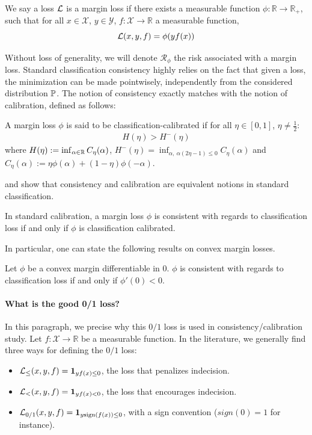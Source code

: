 \begin{definition} We say a loss $\mathcal{L}$ is a margin loss if there exists a measurable function $\phi:\mathbb{R}\to\mathbb{R}_+$, such that for all $x\in\mathcal{X}$, $y\in\mathcal{Y}$, $f:\mathcal{X}\to\mathbb{R}$ a measurable function,
$$\mathcal{L}(x,y,f)=\phi(yf(x))$$
\end{definition}
Without loss of generality, we will denote $\mathcal{R}_\phi$ the risk associated with a margin loss. Standard classification consistency highly relies on the fact that given a loss, the minimization can be made pointwisely, independently from the considered distribution $\mathbb{P}$. The notion of consistency exactly matches with the notion of calibration, defined as follows:
\begin{definition} A margin loss $\phi$ is said to be classification-calibrated if for all $\eta\in[0,1]$, $\eta\neq \frac12$:
\begin{align*}
    H(\eta)>H^-(\eta)
\end{align*}
where $H(\eta):=\inf_{\alpha\in\mathbb{R}}C_\eta(\alpha)$,  $H^-(\eta) = \inf_{\alpha,~\alpha(2\eta-1)\leq0}C_\eta(\alpha)$ and $C_\eta(\alpha):=\eta\phi(\alpha)+(1-\eta)\phi(-\alpha)$.
\end{definition}

\cite{bartlett2006convexity} and \cite{steinwart2007compare} show that consistency and calibration are equivalent notions in standard classification.

\begin{thm} In standard calibration, a margin loss $\phi$ is consistent with regards to classification loss if and only if $\phi$ is classification calibrated. 
\end{thm}

In particular, one can state the following results on convex margin losses.
\begin{thm} Let $\phi$ be a convex margin differentiable in $0$. $\phi$ is consistent with regards to  classification loss if and only if $\phi'(0)<0$.
\end{thm}
\paragraph{What is the good 0/1 loss?}
In this paragraph, we precise why this $0/1$ loss is used in consistency/calibration study. Let $f:\mathcal{X}\to\mathbb{R}$ be a measurable function. In the literature,  we generally find three ways for defining the $0/1$ loss:
\begin{itemize}
    \item $\mathcal{L}_{\leq}(x,y,f)=\mathbf{1}_{yf(x)\leq 0}$, the loss that penalizes indecision.
    \item $\mathcal{L}_{<}(x,y,f)=\mathbf{1}_{yf(x)< 0}$, the loss that encourages indecision.
    \item $\mathcal{L}_{0/1}(x,y,f)=\mathbf{1}_{y\text{sign}(f(x))\leq 0}$, with a sign convention ($sign(0) = 1$ for instance).
\end{itemize}

